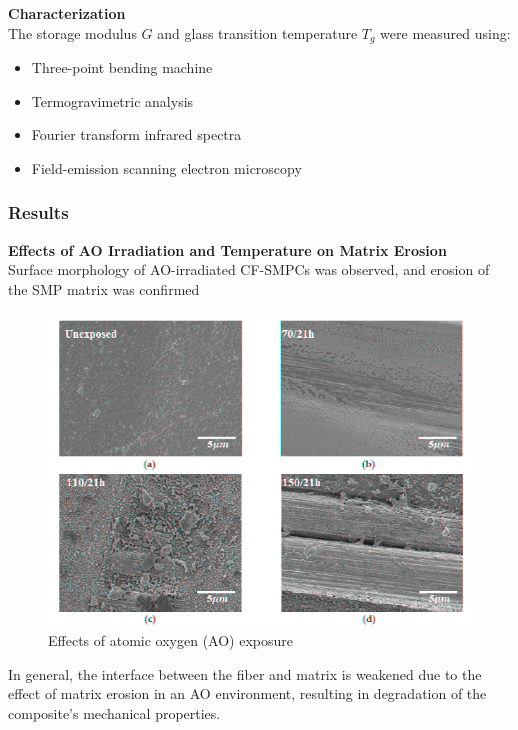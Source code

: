 \documentclass[10pt]{beamer}
\begin{document}
\begin{frame}
\textbf{Characterization}\\
The storage modulus $G$ and glass
transition temperature $T_g$ were measured using:
\begin{itemize}
\item Three-point bending machine  
\item Termogravimetric analysis  
\item Fourier transform infrared spectra  
\item Field-emission scanning electron microscopy
\end{itemize}

\end{frame}

\begin{frame}[label=results]
\small
\frametitle{Results}
\textbf{Effects of AO Irradiation and Temperature on Matrix Erosion}\\
Surface morphology of AO-irradiated CF-SMPCs was observed, and erosion of the SMP matrix was confirmed
\begin{figure}[H]
\centering
\includegraphics[width=0.45\linewidth]{figures/screenshot005}
\caption{Effects of atomic oxygen (AO) exposure}
\label{fig:screenshot005}
\end{figure}
In general, the interface between the fiber and matrix is weakened due to the
effect of matrix erosion in an AO environment, resulting in degradation of the composite’s
mechanical properties. 
\end{frame}
\end{document}
